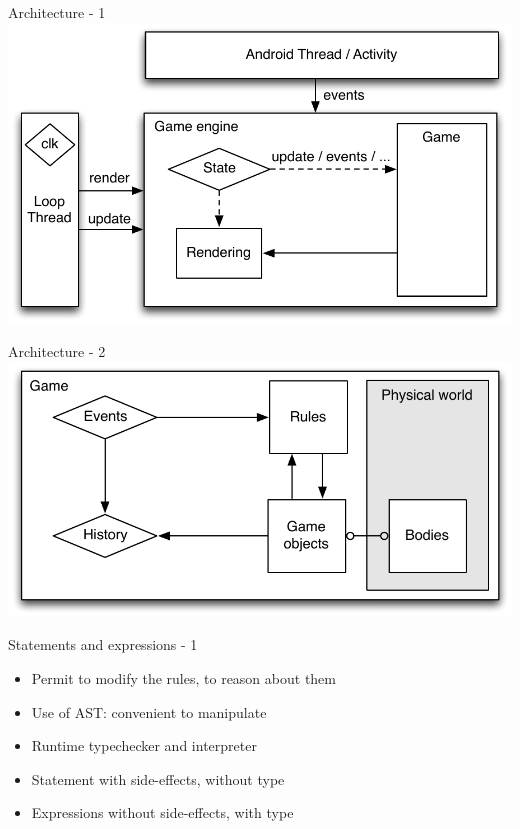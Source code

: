 \documentclass[12pt]{beamer}
\begin{document}
\begin{frame}{Architecture - 1}
\centering
\includegraphics[scale=0.7]{images/architecture-1}
\end{frame}

\begin{frame}{Architecture - 2}
\centering
\includegraphics[scale=0.7]{images/architecture-2}
\end{frame}

\begin{frame}[fragile]{Statements and expressions - 1}
\begin{itemize}
\item Permit to modify the rules, to reason about them
\item Use of AST: convenient to manipulate
\item Runtime typechecker and interpreter
\item Statement with side-effects, without type
\item Expressions without side-effects, with type
\end{itemize}
\end{frame}
\end{document}
